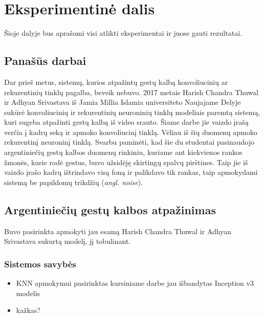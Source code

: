 \documentclass{VUMIFPSbakalaurinis}
\begin{document}
\section{Eksperimentinė dalis}

Šioje dalyje bus aprašomi visi atlikti eksperimentai ir juose gauti rezultatai.

\subsection{Panašūs darbai}
Dar prieš metus, sistemų, kurios atpažintų gestų kalbą konvoliucinių ar rekurentinių tinklų pagalba, beveik nebuvo. 2017 metais Harish Chandra Thuwal ir Adhyan Srivastava iš Jamia Millia Islamia universiteto Naujajame Delyje sukūrė konvoliucinių ir rekurentinių neuroninių tinklų modeliais paremtą sistemą, kuri sugeba atpažinti gestų kalbą iš video srauto. Šiame darbe jie vaizdo įrašą verčia į kadrų seką ir apmoko konvoliucinį tinklą. Vėliau iš šių duomenų apmoko rekurentinį neuroninį tinklą. Svarbu paminėti, kad šie du studentai pasinaudojo argentiniečių gestų kalbos duomenų rinkiniu, kuriame ant kiekvienos rankos žmonės, kurie rodė gestus, buvo užsidėję skirtingų spalvų pirštines. Taip jie iš vaizdo įrašo kadrų ištrindavo visą foną ir palikdavo tik rankas, taip apmokydami sistemą be papildomų trikdžių (\textit{angl. noise}).

\subsection{Argentiniečių gestų kalbos atpažinimas}

Buvo pasirinkta apmokyti jau esamą Harish Chandra Thuwal ir Adhyan Srivastava sukurtą modelį, jį tobulinant.

\subsubsection{Sistemos savybės}
\begin{itemize}
	\item KNN apmokymui pasirinktas kursiniame darbe jau išbandytas Inception v3 modelis
	\item kažkas?
\end{itemize}
\end{document}
